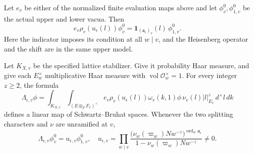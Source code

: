 \begin{srlemma}
\label{lem:sr-cone-finite-vacuum}
Let \(e_v\) be either of the normalized finite evaluation maps above and
let \(\phi_v^0,\phi_{1,v}^0\) be the actual upper and lower vacua. Then
\[
 e_v\rho_v(u_\epsilon(l))\phi_v^0
       =\mathbf1_{(\mathfrak a_\epsilon)_v}(l)\,\phi_{1,v}^0.
 \tag{C4}\label{eq:sr-cone-exact-vacuum}
\]
Here the indicator imposes its condition at all \(w\mid v\), and the
Heisenberg operator and the shift are in the same upper model.

Let \(K_{X,v}\) be the specified lattice stabilizer. Give it probability
Haar measure, and give each \(E_w^\times\) multiplicative Haar measure
with \(\operatorname{vol}\mathcal O_w^\times=1\).
For every integer \(z\ge2\), the formula
\[
 \Lambda_{\epsilon,v}\phi=
  \int_{K_{X,v}}\int_{(E\otimes_F F_v)^\times}
       e_v\rho_v(u_\epsilon(l))\omega_v(k,1)\phi\,
                  \nu_v(l)|l|_{E_v}^{z}\,d^\times l\,dk
 \tag{C5}\label{eq:sr-cone-finite-operator}
\]
defines a linear map of Schwartz--Bruhat spaces.
Whenever the two splitting characters and \(\nu\) are unramified at \(v\),
\[
 \Lambda_{\epsilon,v}\phi_v^0
     =u_{\epsilon,v}\phi_{1,v}^0,\quad
 u_{\epsilon,v}=
 \prod_{w\mid v}
 \frac{\bigl(\nu_w(\varpi_w)Nw^{-z}\bigr)^{
                       \operatorname{ord}_w\mathfrak a_\epsilon}}
      {1-\nu_w(\varpi_w)Nw^{-z}}
 \ne0.
 \tag{C6}\label{eq:sr-cone-finite-euler}
\]
\end{srlemma}

